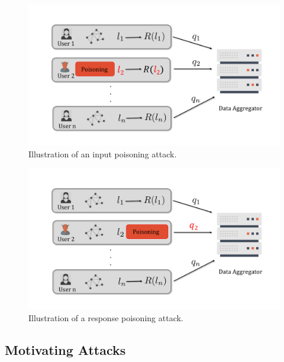 \begin{figure}
    
    \centering
    \includegraphics[width=0.8\columnwidth]{graph_pic_3.pdf}
    
    \caption[Illustration of an input poisoning attack.]{Illustration of an input poisoning attack.}
    \label{chap4-fig:input} 
        
\end{figure}
\begin{figure}[bt]
    \centering
 \includegraphics[width=0.8\columnwidth]{graph_pic_2.pdf}
     
   \caption[Illustration of a response poisoning attack.]{Illustration of a response poisoning attack.}
    \label{chap4-fig:response} 
\end{figure}





    \subsection{Motivating Attacks}\label{chap4-sec:attacks}


